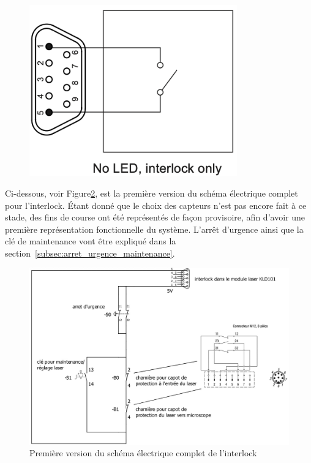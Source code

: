 \begin{minipage}[c]{0.35\textwidth}
    \begin{figure}[H]
        \begin{center}
            \includegraphics[width=0.8\textwidth]{assets/figures/Protections_laser/interlock_only.png}
        \end{center}
        \label{Interlock_only}
    \end{figure}
\end{minipage}

Ci-dessous, voir Figure\ref{schema_interlock_v1}, est la première version du schéma électrique complet pour l'interlock. Étant donné que le choix des capteurs n'est pas encore fait à ce stade, des fins de course ont été représentés de façon provisoire, afin d'avoir une première représentation fonctionnelle du système. L'arrêt d'urgence ainsi que la clé de maintenance vont être expliqué dans la section~\ref{subsec:arret_urgence_maintenance}.

\begin{figure}[H]
    \begin{center}
        \includegraphics[width=\textwidth]{assets/figures/Protections_laser/interlock_schema_elec_V1.jpeg}
    \end{center}
    \caption{Première version du schéma électrique complet de l'interlock}
    \label{schema_interlock_v1}
\end{figure}
\newpage
